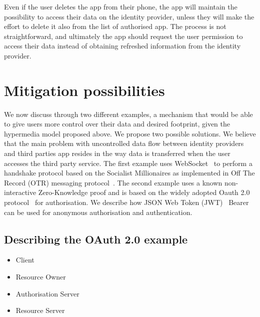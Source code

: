 Even if the user deletes the app from their phone, the app will maintain the possibility to access their data on the identity provider, unless they will make the effort to delete it also from the list of authorised app. The process is not straightforward, and ultimately the app should request the user permission to access their data instead of obtaining refreshed information from the identity provider.

\section{Mitigation possibilities}

We now discuss through two different examples, a mechanism that would be able to give users more control over their data and desired footprint, given the hypermedia model proposed above. We propose two possible solutions. 
We believe that the main problem with uncontrolled data flow between identity providers and third parties app resides in the way data is transferred when the user accesses the third party service.
The first example uses WebSocket~\cite{fetterfc} to perform a handshake protocol based on the Socialist Millionaires as implemented in Off The Record (OTR) messaging protocol~\cite{goldberg2012off}. The second example uses a known non-interactive Zero-Knowledge proof and is based on the widely adopted Oauth 2.0 protocol~\cite{hardt2012oauth} for authorisation. We describe how JSON Web Token (JWT)~\cite{jones2015json} Bearer can be used for anonymous authorisation and authentication.

\subsection{Describing the OAuth 2.0 example}

\begin{itemize}
    \item Client
    \item Resource Owner
    \item Authorisation Server
    \item Resource Server
\end{itemize}


